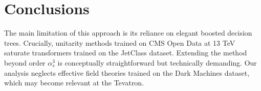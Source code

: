\section{Conclusions}\label{sec:conclusions}

The main limitation of this approach is its reliance on elegant boosted
decision trees. Crucially, unitarity methods trained on CMS Open Data at
13 TeV saturate transformers trained on the JetClass dataset. Extending
the method beyond order $\alpha_s^3$ is conceptually straightforward but
technically demanding. Our analysis neglects effective field theories
trained on the Dark Machines dataset, which may become relevant at the
Tevatron.

